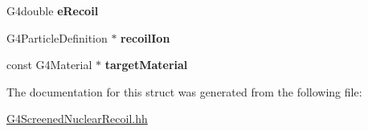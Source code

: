 \begin{DoxyCompactItemize}
\item 
\hypertarget{structG4CoulombKinematicsInfo_a562b3bc73310595d7766eb90b1967d67}{G4double {\bfseries e\-Recoil}}\label{structG4CoulombKinematicsInfo_a562b3bc73310595d7766eb90b1967d67}

\item 
\hypertarget{structG4CoulombKinematicsInfo_a93b6572dfdbb30fc64ce5cf99a7b9bc7}{G4\-Particle\-Definition $\ast$ {\bfseries recoil\-Ion}}\label{structG4CoulombKinematicsInfo_a93b6572dfdbb30fc64ce5cf99a7b9bc7}

\item 
\hypertarget{structG4CoulombKinematicsInfo_a85b16b6a9ae7eea8d989fa93c365891b}{const G4\-Material $\ast$ {\bfseries target\-Material}}\label{structG4CoulombKinematicsInfo_a85b16b6a9ae7eea8d989fa93c365891b}

\end{DoxyCompactItemize}


The documentation for this struct was generated from the following file\-:\begin{DoxyCompactItemize}
\item 
\hyperlink{G4ScreenedNuclearRecoil_8hh}{G4\-Screened\-Nuclear\-Recoil.\-hh}\end{DoxyCompactItemize}
